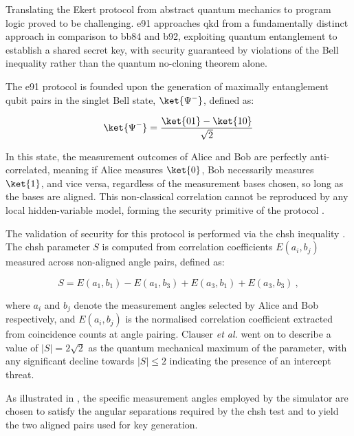 Translating the Ekert protocol from abstract quantum mechanics to program logic proved to be challenging. \gls{e91} approaches \gls{qkd} from a fundamentally distinct approach in comparison to \gls{bb84} and \gls{b92}, exploiting quantum \gls{entanglement} to establish a shared secret key, with security guaranteed by violations of the Bell inequality rather than the quantum no-cloning theorem alone.

The \gls{e91} protocol is founded upon the generation of maximally \gls{entanglement} \gls{qubit} pairs in the singlet Bell state, $\ket{\Psi^-}$, defined as:

\begin{equation}
\ket{\Psi^-} = \frac{\ket{01} - \ket{10}}{\sqrt{2}}
\label{eq:e91_singlet}
\end{equation}

In this state, the measurement outcomes of Alice and Bob are perfectly anti-correlated, meaning if Alice measures $\ket{0}$, Bob necessarily measures $\ket{1}$, and vice versa, regardless of the measurement bases chosen, so long as the bases are aligned. This non-classical correlation cannot be reproduced by any local hidden-variable model, forming the security primitive of the protocol \cite{E91, Bell1964}.

The validation of security for this protocol is performed via the \gls{chsh} inequality \cite{CHSH1969}. The \gls{chsh} parameter $S$ is computed from correlation coefficients $E(a_i, b_j)$ measured across non-aligned angle pairs, defined as:

\begin{equation}
S = E(a_1, b_1) - E(a_1, b_3) + E(a_3, b_1) + E(a_3, b_3) \ ,
\label{eq:chsh_parameter}
\end{equation}

where $a_i$ and $b_j$ denote the measurement angles selected by Alice and Bob respectively, and $E(a_i, b_j)$ is the normalised correlation coefficient extracted from coincidence counts at angle pairing. Clauser \textit{et al.} went on to describe a value of $|S| = 2\sqrt{2}$ as the quantum mechanical maximum \cite{CHSH1969} of the parameter, with any significant decline towards $|S| \leq 2$ indicating the presence of an intercept threat.

As illustrated in , the specific measurement angles employed by the simulator are chosen to satisfy the angular separations required by the \gls{chsh} test and to yield the two aligned pairs used for key generation.

